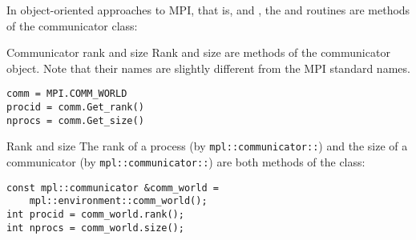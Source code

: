 In object-oriented approaches to MPI,
that is,  and ,
the  and 
routines are methods of the communicator class:

\begin{pythonnote}{Communicator rank and size}
  Rank and size are methods of the communicator object.
  Note that their names are slightly different from the MPI standard names.
\begin{lstlisting}
comm = MPI.COMM_WORLD
procid = comm.Get_rank()
nprocs = comm.Get_size()
\end{lstlisting}
\end{pythonnote}

\begin{mplnote}{Rank and size}
  The rank of a process (by \lstinline+mpl::communicator::+) and
  the size of a communicator (by \lstinline+mpl::communicator::+)
  are both methods of the  class:
\begin{lstlisting}
const mpl::communicator &comm_world =
    mpl::environment::comm_world();
int procid = comm_world.rank();
int nprocs = comm_world.size();
\end{lstlisting}
\end{mplnote}
